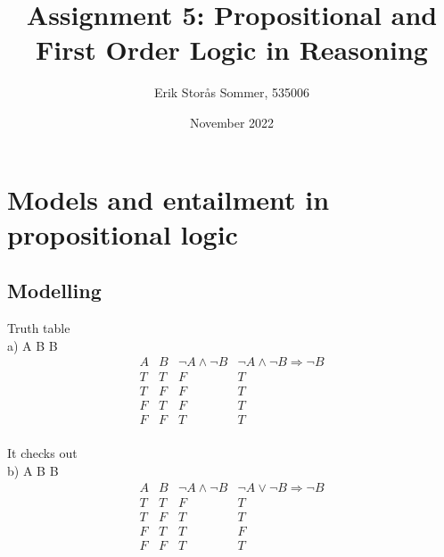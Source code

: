 \documentclass{article}
\title{Assignment 5: Propositional and First Order Logic in Reasoning}
\author{Erik Storås Sommer, 535006}
\date{November 2022}
\begin{document}
\maketitle

\section{Models and entailment in propositional logic}

\subsection{Modelling}

Truth table\\

a) \: \neg A \wedge \neg B \models \neg B\\


\begin{displaymath}
\begin{array}{|c|c|c|c|c}

A & 
B & 
\neg A \wedge \neg B &
\neg A \wedge \neg B \Rightarrow \neg B\\ %
\hline  %
T & T & F & T\\
T & F & F & T\\
F & T & F & T\\
F & F & T & T\\

\end{array}
\end{displaymath}

It checks out\\

b) \: \neg A \vee \neg B \models \neg B\\


\begin{displaymath}
\begin{array}{|c|c|c|c|c}

A &
B & 
\neg A \wedge \neg B &
\neg A \vee \neg B \Rightarrow \neg B\\ %
\hline  %
T & T & F & T\\
T & F & T & T\\
F & T & T & F\\
F & F & T & T\\

\end{array}
\end{displaymath}
\end{document}
